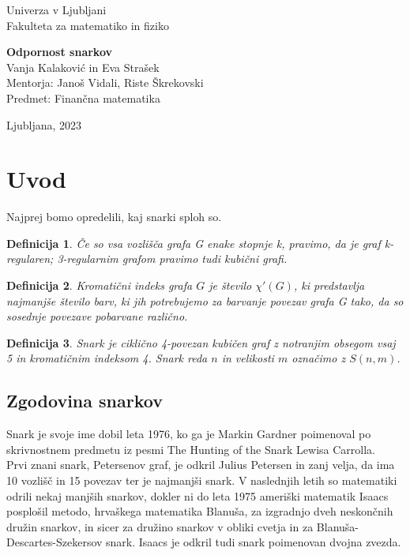 \documentclass[a4paper, 10pt]{article}
\begin{document}
\newtheorem{example}{Zgled}
\newtheorem{theorem}{Izrek}
\newtheorem{proof}{Dokaz}
\newtheorem{definition}{Definicija}
\newtheorem{lemma}{Lema}

\thispagestyle{empty}
{\large
\noindent Univerza v Ljubljani\\[1mm]
Fakulteta za matematiko in fiziko\\[5mm]}
\vfill

\begin{center}{\Large
{\bf Odpornost snarkov}\\[2mm]
Vanja Kalaković in Eva Strašek\\[10mm]
Mentorja: Janoš Vidali, Riste Škrekovski\\[2mm]
Predmet: Finančna matematika \\[2mm]}
\end{center}
\vfill

{\large
Ljubljana, 2023}
\pagebreak



\section{Uvod}

Najprej bomo opredelili, kaj snarki sploh so.

\begin{definition}
    Če so vsa vozlišča grafa G enake stopnje k, pravimo, da je graf
k-regularen; 3-regularnim grafom pravimo tudi kubični grafi.
\end{definition}
\begin{definition}
    Kromatični indeks grafa $G$ je število $\chi'(G)$, ki predstavlja najmanjše 
    število barv, ki jih potrebujemo za barvanje povezav grafa G tako,
    da so sosednje povezave pobarvane različno.
\end{definition}
\begin{definition}
    Snark je ciklično 4-povezan kubičen graf z notranjim obsegom vsaj 5 in 
    kromatičnim indeksom 4. Snark reda $n$ in velikosti $m$ označimo z $S(n,m)$.
\end{definition}

 
\subsection*{Zgodovina snarkov}
Snark je svoje ime dobil leta 1976, ko ga je Markin Gardner poimenoval po skrivnostnem 
predmetu iz pesmi The Hunting of the Snark Lewisa Carrolla. \\
Prvi znani snark, Petersenov graf, je odkril Julius Petersen in zanj velja, da ima 10 vozlišč
in 15 povezav ter je najmanjši snark. V naslednjih letih so matematiki odrili nekaj manjših
snarkov, dokler ni do leta 1975 ameriški matematik Isaacs posplošil metodo, hrvaškega
matematika Blanuša, za izgradnjo dveh neskončnih družin snarkov, in sicer za družino
snarkov v obliki cvetja in za Blanuša-Descartes-Szekersov snark. Isaacs je odkril tudi snark 
poimenovan dvojna zvezda.  
\end{document}
